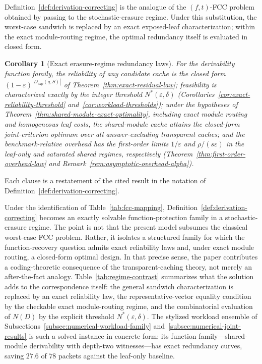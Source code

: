 \documentclass[journal]{IEEEtran}
\makeatletter
\newtheorem{corollary}{Corollary}[section]
\numberwithin{equation}{section}
\renewenvironment{proof}[1][\proofname]{\par
  \pushQED{\qed}%
  \normalfont \topsep6\p@\@plus6\p@\relax
  \trivlist
  \item[\hskip\labelsep
        \itshape
    #1\@addpunct{.}]\ignorespaces
}{%
  \popQED\endtrivlist\@endpefalse
}
\makeatother
\begin{document}
Definition~\ref{def:derivation-correcting} is the analogue of the
\((f,t)\)-FCC problem obtained by passing to the stochastic-erasure
regime.  Under this substitution, the
worst-case sandwich is replaced by an exact exposed-leaf characterization;
within the exact module-routing regime, the optimal redundancy itself is
evaluated in closed form.

\begin{corollary}[Exact erasure-regime redundancy laws]
\label{cor:erasure-regime-redundancy}
For the derivability function family, the reliability of any candidate
cache is the closed form \((1-\varepsilon)^{|D_{\mathrm{exp}}(q,S)|}\) of
Theorem~\ref{thm:exact-residual-law}; feasibility is characterized exactly
by the integer threshold \(N^{*}(\varepsilon,\delta)\)
(Corollaries~\ref{cor:exact-reliability-threshold}
and~\ref{cor:workload-thresholds}); under the hypotheses of
Theorem~\ref{thm:shared-module-exact-optimality}, including exact module
routing and homogeneous leaf costs, the shared-module cache attains the
closed-form joint-criterion optimum over all answer-excluding transparent
caches; and the benchmark-relative overhead has the first-order limits
\(1/\varepsilon\) and \(\rho/(s\varepsilon)\) in the leaf-only and
saturated shared regimes, respectively
(Theorem~\ref{thm:first-order-overhead-law} and
Remark~\ref{rem:asymptotic-overhead-alpha}).
\end{corollary}

\begin{proof}
Each clause is a restatement of the cited result in the notation of
Definition~\ref{def:derivation-correcting}.
\end{proof}

Under the identification of Table~\ref{tab:fcc-mapping},
Definition~\ref{def:derivation-correcting} becomes an exactly solvable
function-protection family in a stochastic-erasure regime.  The point is
not that the present model subsumes the classical worst-case FCC problem.
Rather, it isolates a structured family for which the function-recovery
question admits exact reliability laws and, under exact module routing, a
closed-form optimal design.  In that precise sense, the paper contributes a
coding-theoretic consequence of the transparent-caching theory, not merely
an after-the-fact analogy.
Table~\ref{tab:regime-contrast} summarizes what the solution adds to the
correspondence itself: the general sandwich characterization is replaced by
an exact reliability law, the representative-vector equality condition by
the checkable exact module-routing regime, and the combinatorial evaluation
of \(N(D)\) by the explicit threshold \(N^{*}(\varepsilon,\delta)\).
The stylized workload ensemble of
Subsections~\ref{subsec:numerical-workload-family}
and~\ref{subsec:numerical-joint-results} is such a solved instance in
concrete form: its function family---shared-module derivability with
depth-two witnesses---has exact redundancy curves, saving \(27.6\) of
\(78\) packets against the leaf-only baseline.
\end{document}
